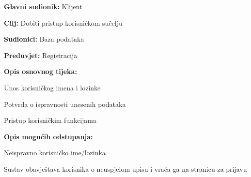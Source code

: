                         \noindent {}
					\begin{packed_item}
	
						\item \textbf{Glavni sudionik: }Klijent
						\item  \textbf{Cilj:} Dobiti pristup korisničkom sučelju
						\item  \textbf{Sudionici:} Baza podataka
						\item  \textbf{Preduvjet:} Registracija
						\item  \textbf{Opis osnovnog tijeka:}
						
						\item[] \begin{packed_enum}
	
							\item Unos korisničkog imena i lozinke
							\item Potvrda o ispravnosti unesenih podataka
							\item Pristup korisničkim funkcijama
							
						\end{packed_enum}

                            \item  \textbf{Opis mogućih odstupanja:}
						
						\item[] \begin{packed_item}
	
							\item[2.a] Neispravno korisničko ime/lozinka
							\item[] \begin{packed_enum}
								
								\item Sustav obavještava korisnika o neuspjelom upisu i vraća ga na stranicu za prijavu
								
								
							\end{packed_enum}
	
							
						\end{packed_item}	
					\end{packed_item}

